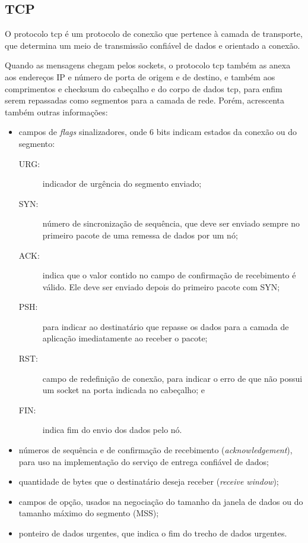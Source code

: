 
\subsection*{TCP}

O protocolo \gls*{tcp} é um protocolo de conexão que pertence à camada de transporte,
que determina um meio de transmissão confiável de dados e orientado a conexão.

Quando as mensagens chegam pelos \glspl*{socket}, o protocolo \gls*{tcp} também as anexa
aos endereços IP e número de porta de origem e de destino, e também aos comprimentos e
\gls*{checksum} do cabeçalho e do corpo de dados \gls*{tcp}, para enfim serem repassadas
como segmentos para a camada de rede. Porém, acrescenta também outras informações:

\begin{itemize}
    \item campos de \emph{flags} sinalizadores, onde 6 bits indicam estados da conexão
        ou do segmento:
        \begin{description}
            \item[URG:] indicador de urgência do segmento enviado;

            \item[SYN:] número de sincronização de sequência, que deve ser enviado
                sempre no primeiro pacote de uma remessa de dados por um nó;

            \item[ACK:] indica que o valor contido no campo de confirmação de
                recebimento é válido. Ele deve ser enviado depois do primeiro pacote com
                SYN;

            \item[PSH:] para indicar ao destinatário que repasse os dados para a camada
                de aplicação imediatamente ao receber o pacote;

            \item[RST:] campo de redefinição de conexão, para indicar o erro de que não
                possui um \gls*{socket} na porta indicada no cabeçalho; e

            \item[FIN:] indica fim do envio dos dados pelo nó.
        \end{description}

    \item números de sequência e de confirmação de recebimento (\emph{acknowledgement}),
        para uso na implementação do serviço de entrega confiável de dados;

    \item quantidade de bytes que o destinatário deseja receber (\emph{receive window});

    \item campos de opção, usados na negociação do tamanho da janela de dados ou do
        tamanho máximo do segmento (MSS);

    \item ponteiro de dados urgentes, que indica o fim do trecho de dados urgentes.
\end{itemize}

